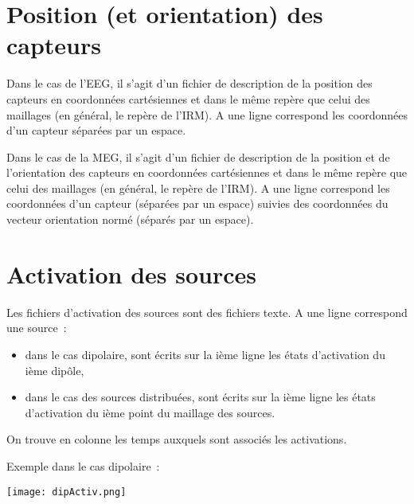 \section{Position (et orientation) des capteurs}
\label{sect: annexe 4}

\noindent
Dans le cas de l'EEG, il s'agit d'un fichier de description de la position des capteurs en coordonnées cartésiennes et dans le
même repère que celui des maillages (en général, le repère de l'IRM). A une ligne correspond les coordonnées d'un capteur
séparées par un espace. 

\medskip

\noindent
Dans le cas de la MEG, il s'agit d'un fichier de description de la position et de l'orientation des capteurs en coordonnées
cartésiennes et dans le même repère que celui des maillages (en général, le repère de l'IRM). A une ligne correspond les
coordonnées d'un capteur (séparées par un espace) suivies des coordonnées du vecteur orientation normé (séparés par un espace).

\section{Activation des sources}
\label{sect: annexe 5}

\noindent
Les fichiers d'activation des sources sont des fichiers texte. A une ligne correspond une source~: 
\begin{itemize}
    \item dans le cas dipolaire, sont écrits sur la ième ligne les états d'activation du ième dipôle,
    \item dans le cas des sources distribuées, sont écrits sur la ième ligne les états d'activation du ième point du maillage
          des sources.
\end{itemize}

\medskip

\noindent
On trouve en colonne les temps auxquels sont associés les activations.

\medskip

\noindent
Exemple dans le cas dipolaire~:

\centerline{\texttt{[image: dipActiv.png]}}
